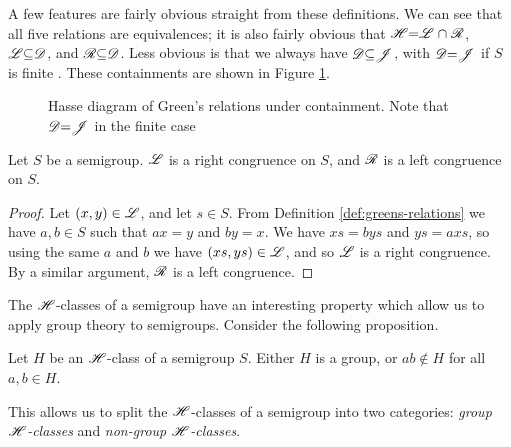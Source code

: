 A few features are fairly obvious straight from these definitions.  We can see
that all five relations are equivalences; it is also fairly obvious that
$\mathrel{\mathscr{H}} = \mathrel{\mathscr{L}} \cap \mathrel{\mathscr{R}}$, $\mathrel{\mathscr{L}} \subseteq \mathrel{\mathscr{D}}$, and $\mathrel{\mathscr{R}} \subseteq \mathrel{\mathscr{D}}$.  Less
obvious is that we always have $\mathrel{\mathscr{D}} \subseteq \mathrel{\mathscr{J}}$, with $\mathrel{\mathscr{D}} = \mathrel{\mathscr{J}}$ if $S$ is
finite \cite[\S2.1]{howie}.  These containments are shown in Figure
\ref{fig:greens-containment}.

\begin{figure}[h]
  \centering
  \caption[Hasse diagram of Green's relations under containment]{Hasse diagram
    of Green's relations under containment.  Note that $\mathrel{\mathscr{D}} = \mathrel{\mathscr{J}}$ in the finite
    case}
  \label{fig:greens-containment}
\end{figure}

\begin{proposition}
  \label{prop:greens-as-congs}
  Let $S$ be a semigroup.  $\mathrel{\mathscr{L}}$ is a right congruence on $S$, and $\mathrel{\mathscr{R}}$ is a
  left congruence on $S$.
  \begin{proof}
    Let $(x,y) \in \mathscr{L}$, and let $s \in S$.  From Definition
    \ref{def:greens-relations} we have $a,b \in S$ such that $ax=y$ and $by=x$.
    We have $xs = bys$ and $ys = axs$, so using the same $a$ and $b$ we have
    $(xs,ys) \in \mathscr{L}$, and so $\mathrel{\mathscr{L}}$ is a right congruence.  By a similar
    argument, $\mathrel{\mathscr{R}}$ is a left congruence.
  \end{proof}
\end{proposition}

The $\mathrel{\mathscr{H}}$-classes of a semigroup have an interesting property which allow us to
apply group theory to semigroups.  Consider the following proposition.

\begin{proposition}
  \label{prop:group-h-class}
  Let $H$ be an $\mathrel{\mathscr{H}}$-class of a semigroup $S$.  Either $H$ is a group, or
  $ab \notin H$ for all $a,b \in H$.
\end{proposition}

This allows us to split the $\mathrel{\mathscr{H}}$-classes of a semigroup into two categories:
\textit{group $\mathrel{\mathscr{H}}$-classes} and \textit{non-group $\mathrel{\mathscr{H}}$-classes}.

